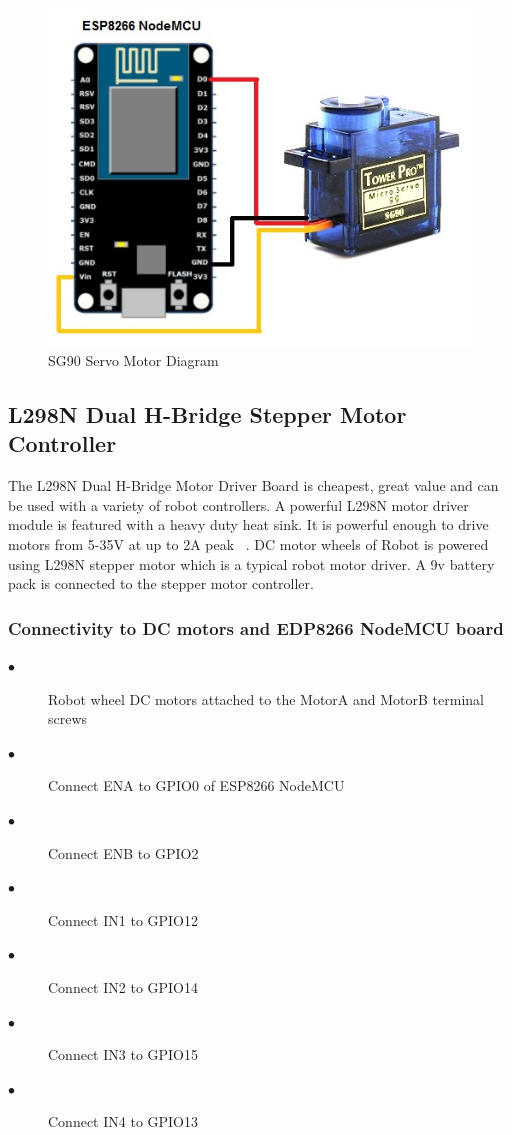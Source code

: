 \documentclass[sigconf]{acmart}
\begin{document}
\begin{figure}
	\includegraphics[width=1.0\columnwidth]{images/SG90-servo.jpg}
	\caption{SG90 Servo Motor Diagram}
\end{figure}

\subsection{L298N Dual H-Bridge Stepper Motor Controller}
The L298N Dual H-Bridge Motor Driver Board is cheapest, great value and can be used with a variety of robot controllers. A powerful L298N motor driver module is featured with a heavy duty heat sink. It is powerful enough to drive motors from 5-35V at up to 2A peak ~\cite{bananarobotics2013}.
DC motor wheels of Robot is powered using L298N stepper motor which is a typical robot motor driver. A 9v battery pack is connected to the stepper motor controller.

\subsubsection{Connectivity to DC motors and EDP8266 NodeMCU board}
\begin{description}
\item[$\bullet$] Robot wheel DC motors attached to the MotorA and MotorB terminal screws
\item[$\bullet$] Connect ENA to GPIO0 of ESP8266 NodeMCU
\item[$\bullet$] Connect ENB to GPIO2
\item[$\bullet$] Connect IN1 to GPIO12
\item[$\bullet$] Connect IN2 to GPIO14
\item[$\bullet$] Connect IN3 to GPIO15
\item[$\bullet$] Connect IN4 to GPIO13
\end{description}
\end{document}
